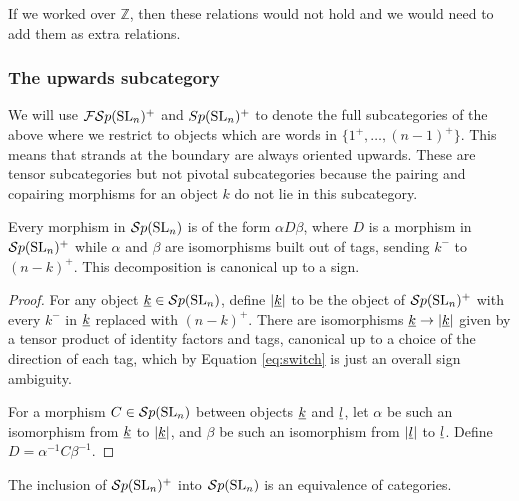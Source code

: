 \documentclass[10pt,leqno]{article}
\begin{document}
\begin{rem}
If we worked over $ \mathbb Z$, then these relations would not hold and we would need to add them as extra relations.
\end{rem}


\subsubsection{The upwards subcategory}
We will use ${\mathcal{FS}p}({\rm{SL}}_n)^+$ and $Sp({\rm{SL}}_n)^+$ to denote the full subcategories of the above where we restrict to objects which are words in $\{1^+,\ldots,(n-1)^+\}$. This means that strands at the boundary are always oriented upwards. These are tensor subcategories but not pivotal subcategories because the pairing and copairing morphisms for an object $k$ do not lie in this subcategory.

\begin{lem}
Every morphism in ${\mathcal{S}p}({\rm{SL}}_n)$ is of the form $\alpha D \beta$, where $D$ is a morphism in ${\mathcal{S}p}({\rm{SL}}_n)^+$ while $\alpha$ and $\beta$ are isomorphisms built out of tags, sending $k^-$ to $(n-k)^+$.  This decomposition is canonical up to a sign.
\end{lem}
\begin{proof}
For any object ${\underline{k}} \in {\mathcal{S}p}({\rm{SL}}_n)$, define $\left|{\underline{k}}\right|$ to be the object of ${\mathcal{S}p}({\rm{SL}}_n)^+$ with every $k^-$ in ${\underline{k}}$ replaced with $(n-k)^+$. There are isomorphisms ${\underline{k}} \to \left|{\underline{k}}\right|$ given by a tensor product of identity factors and tags, canonical up to a choice of the direction of each tag, which by Equation \eqref{eq:switch} is just an overall sign ambiguity.

For a morphism $C \in {\mathcal{S}p}({\rm{SL}}_n)$ between objects ${\underline{k}}$ and ${\underline{l}}$, let $\alpha$ be such an isomorphism from ${\underline{k}}$ to $\left|{\underline{k}}\right|$, and $\beta$ be such an isomorphism from $\left|{\underline{l}}\right|$ to ${\underline{l}}$. Define $D = \alpha^{-1} C \beta^{-1}$.

\end{proof}

\begin{cor}
The inclusion of ${\mathcal{S}p}({\rm{SL}}_n)^+$ into $ {\mathcal{S}p}({\rm{SL}}_n) $ is an equivalence of  categories.
\end{cor}
\end{document}

